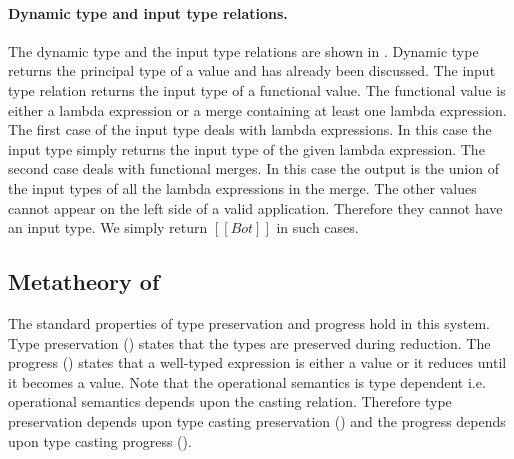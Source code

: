 
\paragraph{Dynamic type and input type relations.}
The dynamic type and the input type relations are shown
in . Dynamic type returns
the principal type of a value and has already been
discussed. The input type relation returns the input
type of a functional value. The functional value is
either a lambda expression or a merge containing at least
one lambda expression. The first case of the input type
deals with lambda expressions. In this case the input
type simply returns the input type of the given lambda
expression. The second case deals with functional
merges. In this case the output is the union of
the input types of all the lambda expressions in the
merge. The other values cannot appear on the left
side of a valid application. Therefore they cannot
have an input type. We simply return $[[Bot]]$ in
such cases.


\subsection{Metatheory of \namems}

The standard properties of type preservation and progress
hold in this system.
Type preservation () states that
the types are preserved during reduction.
The progress ()
states that a well-typed expression is either a value or
it reduces until it becomes a value.
Note that the operational semantics is type dependent i.e.
operational semantics depends upon the casting relation.
Therefore type preservation depends upon
type casting preservation ()
and the progress depends upon type casting progress
().

